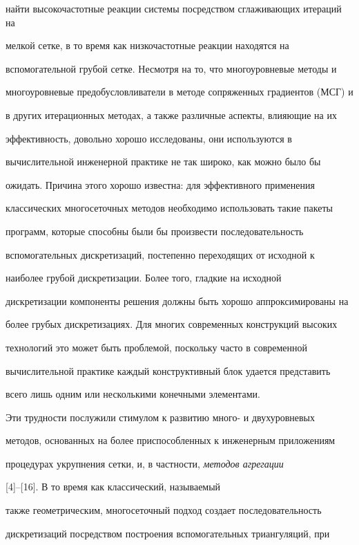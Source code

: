 найти высокочастотные реакции системы посредством сглаживающих итераций на


мелкой сетке, в то время как низкочастотные реакции находятся на


вспомогательной грубой сетке. Несмотря на то, что многоуровневые методы и


многоуровневые предобусловливатели в методе сопряженных градиентов (МСГ) и


в других итерационных методах, а также различные аспекты, влияющие на их


эффективность, довольно хорошо исследованы, они используются в


вычислительной инженерной практике не так широко, как можно было бы


ожидать. Причина этого хорошо известна: для эффективного применения


классических многосеточных методов необходимо использовать такие пакеты


программ, которые способны были бы произвести последовательность


вспомогательных дискретизаций, постепенно переходящих от исходной к


наиболее грубой дискретизации. Более того, гладкие на исходной


дискретизации компоненты решения должны быть хорошо аппроксимированы на


более грубых дискретизациях. Для многих современных конструкций высоких


технологий это может быть проблемой, поскольку часто в современной


вычислительной практике каждый конструктивный блок удается представить


всего лишь одним или несколькими конечными элементами.





Эти трудности послужили стимулом к развитию много- и двухуровневых


методов, основанных на более приспособленных к инженерным приложениям


процедурах укрупнения сетки, и, в частности, {\em методов агрегации}


[4]--[16]. В то время как классический, называемый


также геометрическим, многосеточный подход создает последовательность


дискретизаций посредством построения вспомогательных триангуляций, при


